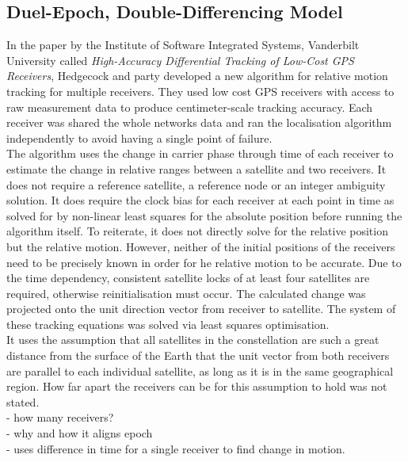 \subsection{Duel-Epoch, Double-Differencing Model} \label{DEDD}
In the paper by the Institute of Software Integrated Systems, Vanderbilt University called \textit{High-Accuracy Differential Tracking of Low-Cost GPS Receivers}, Hedgecock and party developed a new algorithm for relative motion tracking for multiple receivers. They used low cost GPS receivers with access to raw measurement data to produce centimeter-scale tracking accuracy. Each receiver was shared the whole networks data and ran the localisation algorithm independently to avoid having a single point of failure.\\

The algorithm uses the change in carrier phase through time of each receiver to estimate the change in relative ranges between a satellite and two receivers. It does not require a reference satellite, a reference node or an integer ambiguity solution. It does require the clock bias for each receiver at each point in time as solved for by non-linear least squares for the absolute position before running the algorithm itself. To reiterate, it does not directly solve for the relative position but the relative motion. However, neither of the initial positions of the receivers need to be precisely known in order for he relative motion to be accurate. Due to the time dependency, consistent satellite locks of at least four satellites are required, otherwise reinitialisation must occur. The calculated change was projected onto the unit direction vector from receiver to satellite. The system of these tracking equations was solved via least squares optimisation. \\

It uses the assumption that all satellites in the constellation are such a great distance from the surface of the Earth that the unit vector from both receivers are parallel to each individual satellite, as long as it is in the same geographical region. How far apart the receivers can be for this assumption to hold was not stated.\\ 




- how many receivers?\\
- why and how it aligns epoch\\
- uses difference in time for a single receiver to find change in motion.



